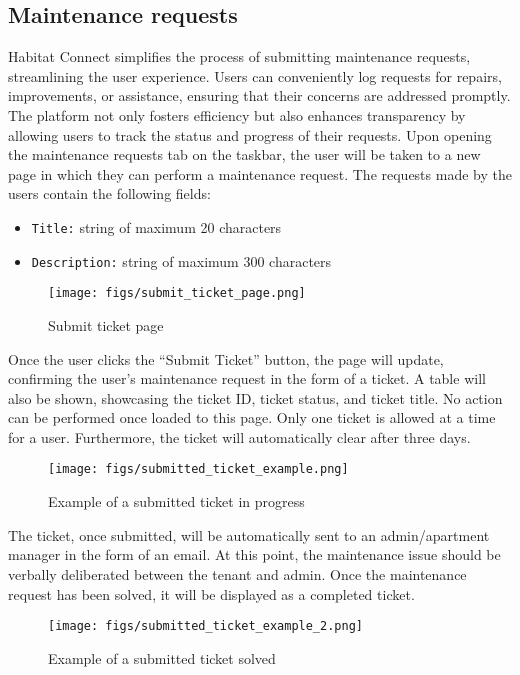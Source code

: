 \documentclass[conference]{IEEEtran}
\begin{document}
\subsection{Maintenance requests}
Habitat Connect simplifies the process of submitting maintenance requests, streamlining the user experience. Users can conveniently log requests for repairs, improvements, or assistance, ensuring that their concerns are addressed promptly. The platform not only fosters efficiency but also enhances transparency by allowing users to track the status and progress of their requests. Upon opening the maintenance requests tab on the taskbar, the user will be taken to a new page in which they can perform a maintenance request.
The requests made by the users contain the following fields:
\begin{itemize}
    \item \texttt{Title:} string of maximum 20 characters
    \item \texttt{Description:} string of maximum 300 characters
\end{itemize}
\begin{figure}[H]
\centering
\texttt{[image: figs/submit\_ticket\_page.png]}
\caption{Submit ticket page}
\label{fig:Submit ticket page}
\end{figure}
Once the user clicks the “Submit Ticket” button, the page will update, confirming the user's maintenance request in the form of a ticket. A table will also be shown, showcasing the ticket ID, ticket status, and ticket title. No action can be performed once loaded to this page. Only one ticket is allowed at a time for a user. Furthermore, the ticket will automatically clear after three days.
\begin{figure}[H]
\centering
\texttt{[image: figs/submitted\_ticket\_example.png]}
\caption{Example of a submitted ticket in progress}
\label{fig:Example of a submitted ticket in progress}
\end{figure}
The ticket, once submitted, will be automatically sent to an admin/apartment manager in the form of an email. At this point, the maintenance issue should be verbally deliberated between the tenant and admin. Once the maintenance request has been solved, it will be displayed as a completed ticket. 
\begin{figure}[H]
\centering
\texttt{[image: figs/submitted\_ticket\_example\_2.png]}
\caption{Example of a submitted ticket solved}
\label{fig:Example of a submitted ticket solved}
\end{figure}
\end{document}
